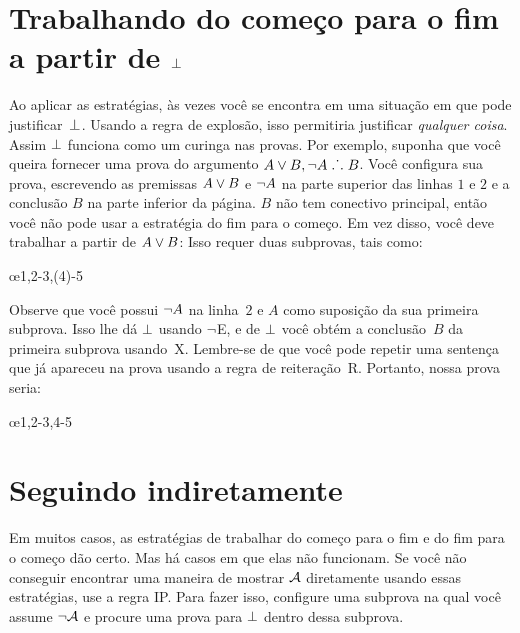 
\section{Trabalhando do come\c co para o fim a partir de $\bot$}\label{sec:backred}

Ao aplicar as estrat\'egias, \`as vezes voc\^e se encontra em uma situa\c c\~ao em que pode justificar~$\bot$. Usando a regra de explos\~ao, isso permitiria justificar \emph{qualquer coisa}. Assim $\bot$ funciona como um curinga nas provas. Por exemplo, suponha que voc\^e queira fornecer uma prova do argumento $A \vee B, \neg A \mathrel{\ldotp\dot{}\,\ldotp} B$. Voc\^e configura sua prova, escrevendo as premissas $A \vee B$ e $\neg A$ na parte superior das linhas $1$ e $2$ e a conclus\~ao $B$ na parte inferior da p\'agina. $B$ n\~ao tem conectivo principal, ent\~ao voc\^e n\~ao pode usar a estrat\'egia do fim para o come\c co. Em vez disso, voc\^e deve trabalhar a partir de $A \vee B$: Isso requer duas subprovas,  tais como:


\begin{fitchproof}
	\open
	\ellipsesline 
	\close 
	\open
	\ellipsesline
	\close
	\oe{1,2-3,(4)-5} 
\end{fitchproof} 
Observe que voc\^e possui   $\neg A$ na linha~$2$ e $A$ como suposi\c c\~ao da sua primeira subprova. Isso lhe d\'a  $\bot$  usando $\neg$E, e de $\bot$ voc\^e obt\'em a conclus\~ao~$B$ da primeira subprova usando~X. Lembre-se de que voc\^e pode repetir uma senten\c ca que j\'a apareceu na prova  usando a regra de reitera\c c\~ao~R. Portanto, nossa prova seria:
\begin{fitchproof}
	\open
	\close 
	\open
	\close
	\oe{1,2-3,4-5} 
\end{fitchproof} 
\section{Seguindo indiretamente}

Em muitos casos, as estrat\'egias de trabalhar do come\c co para o fim  e do fim para o come\c co d\~ao certo. Mas h\'a casos em que elas n\~ao funcionam. Se voc\^e n\~ao conseguir encontrar uma maneira de mostrar $\mathcal{A}$ diretamente usando essas estrat\'egias,  use a regra IP. Para fazer isso, configure uma subprova na qual voc\^e assume  $\neg\mathcal{A}$  e procure uma prova para $\bot$ dentro dessa subprova.

